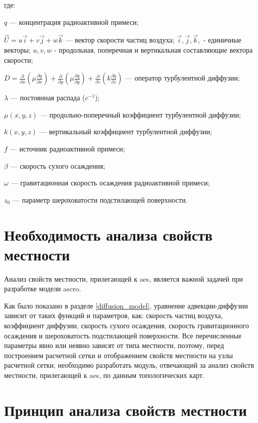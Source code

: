 где:
\begin{description}
    \item $q$ --- концентрация радиоактивной примеси;
    \item $\vec{U}=u\vec{i} + v\vec{j} + w\vec{k}$ --- вектор скорости частиц воздуха; $\vec{i}, \vec{j}, \vec{k},$ 
    	- единичные векторы; $u, v, w$ - продольная, поперечная и вертикальная составляющие вектора скорости; 
    \item $D = \frac{\partial}{\partial x}(\mu \frac{\partial q}{\partial x}) 
    	+ \frac{\partial}{\partial y}(\mu \frac{\partial q}{\partial y})
    	+ \frac{\partial}{\partial z}(k \frac{\partial q}{\partial z})$ --- оператор турбулентной диффузии; 
    \item $\lambda$ --- постоянная распада ($c^{-1}$);
    \item $\mu(x,y,z)$ --- продольно-поперечный коэффициент турбулентной диффузии;
    \item $k(x,y,z)$ --- вертикальный коэффициент турбулентной диффузии;
    \item $f$ --- источник радиоактивной примеси;
    \item $\beta$ --- скорость сухого осаждения;
    \item $\omega$ --- гравитационная скорость осаждения радиоактивной примеси;
    \item $z_{0}$ --- параметр шероховатости подстилающей поверхности.
\end{description}

\section{Необходимость анализа свойств местности}

Анализ свойств местности, прилегающей к \ac{aes}, является важной задачей при разработке модели \ac{ascro}. 

Как было показано в разделе \ref{diffusion_model}, уравнение адвекции-диффузии зависит от таких функций и параметров, 
как: скорость частиц воздуха, коэффициент диффузии, скорость сухого осаждения, скорость гравитационного осаждения и 
шероховатость подстилающей поверхности. Все перечисленные параметры явно или неявно зависят от типа местности, 
поэтому, перед построением расчетной сетки и отображением свойств местности на узлы расчетной сетки, необходимо 
разработать модуль, отвечающий за анализ свойств местности, прилегающей к \ac{aes}, по данным топологических карт.

\section{Принцип анализа свойств местности}

